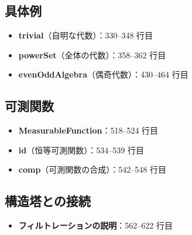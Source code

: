 \documentclass[12pt,a4paper,ja=standard]{bxjsarticle}
\theoremstyle{definition}
\begin{document}
\subsection*{具体例}

\begin{itemize}
    \item \textbf{trivial}（自明な代数）：330--348 行目
    \item \textbf{powerSet}（全体の代数）：358--362 行目
    \item \textbf{evenOddAlgebra}（偶奇代数）：430--464 行目
\end{itemize}

\subsection*{可測関数}

\begin{itemize}
    \item \textbf{MeasurableFunction}：518--524 行目
    \item \textbf{id}（恒等可測関数）：534--539 行目
    \item \textbf{comp}（可測関数の合成）：542--548 行目
\end{itemize}

\subsection*{構造塔との接続}

\begin{itemize}
    \item \textbf{フィルトレーションの説明}：562--622 行目
\end{itemize}
\end{document}
